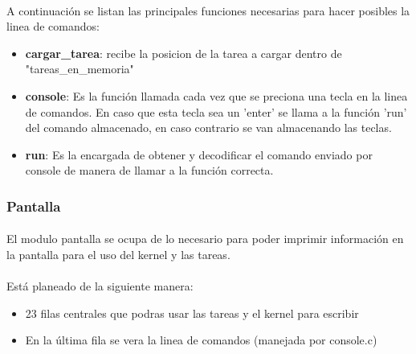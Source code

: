 \documentclass[11pt, a4paper]{article}
\begin{document}
\paragraph{}
A continuación se listan las principales funciones necesarias para hacer posibles la linea de comandos:
\begin{itemize}

\item \textbf{ cargar\_tarea}: recibe la posicion de la tarea a cargar dentro de "tareas\_en\_memoria"

\item \textbf{console}: Es la función llamada cada vez que se preciona una tecla en la linea de comandos. En caso que esta tecla sea un 'enter' se llama a la función 'run' del comando almacenado, en caso contrario se van almacenando las teclas.
\item \textbf{run}: Es la encargada de obtener y decodificar el comando enviado por console de manera de llamar a la función correcta.
\end{itemize}				



\subsubsection{Pantalla}


\paragraph{}
El modulo pantalla se ocupa de lo necesario para poder imprimir información en la pantalla para el uso del kernel y las tareas.
\paragraph{}
Está planeado de la siguiente manera:
\begin{itemize}
\item 23 filas centrales que podras usar las tareas y el kernel para escribir
\item En la última fila se vera la linea de comandos (manejada por console.c) 

\end{itemize}


 
\end{document}

